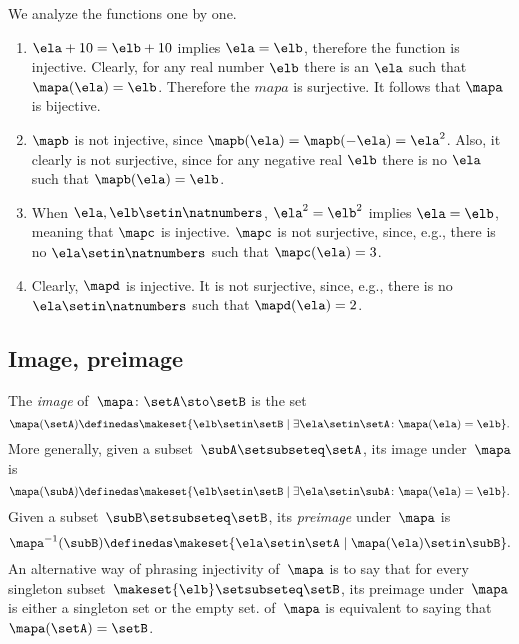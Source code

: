 \begin{solution}
    We analyze the functions one by one.
    \begin{enumerate}
        \item $\ela + 10 = \elb + 10$ implies $\ela=\elb$, therefore the function is injective.
              Clearly, for any real number $\elb$ there is an $\ela$ such that $\mapa(\ela)=\elb$.
              Therefore the $mapa$ is surjective.
              It follows that $\mapa$ is bijective.
        \item $\mapb$ is not injective, since $\mapb(\ela)=\mapb(-\ela)=\ela^2$.
              Also, it clearly is not surjective, since for any negative real $\elb$ there is no $\ela$ such that $\mapb(\ela)=\elb$.
        \item When $\ela,\elb \setin \natnumbers$, $\ela^2=\elb^2$ implies $\ela=\elb$, meaning that $\mapc$ is injective.
              $\mapc$ is not surjective, since, e.g., there is no $\ela\setin \natnumbers$ such that $\mapc(\ela)=3$.
        \item Clearly, $\mapd$ is injective.
              It is not surjective, since, e.g., there is no $\ela\setin \natnumbers$ such that $\mapd(\ela)=2$.
    \end{enumerate}
\end{solution}

\subsection{Image, preimage}

The \emph{image} of~$\mapa\colon \setA \sto \setB$ is the set
\begin{equation}
    \mapa(\setA) \definedas \makeset{ \elb \setin\setB \mid \exists \ela \setin\setA \colon \mapa(\ela) = \elb }.
\end{equation}
More generally, given a subset~$\subA \setsubseteq \setA$, its image under~$\mapa$ is
\begin{equation}
    \mapa(\subA) \definedas \makeset{ \elb \setin\setB \mid \exists \ela \setin\subA \colon \mapa(\ela) = \elb }.
\end{equation}
Given a subset~$\subB \setsubseteq \setB$, its \emph{preimage} under~$\mapa$ is
\begin{equation}
    \mapa^{-1}(\subB) \definedas \makeset{ \ela \setin\setA \mid \mapa(\ela) \setin\subB }.
\end{equation}
An alternative way of phrasing injectivity of~$\mapa$ is to say that for every singleton subset~$\makeset{ \elb } \setsubseteq \setB$, its preimage under~$\mapa$ is either a singleton set or the empty set.
 of~$\mapa$ is equivalent to saying that~$\mapa(\setA) = \setB$.

